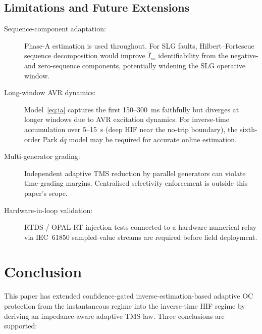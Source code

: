 \documentclass[10pt,journal,twoside]{IEEEtran}
\newcommand{\Iss}{\hat{I}_{ss}}
\begin{document}
\subsection{Limitations and Future Extensions}

\begin{description}
\item[Sequence-component adaptation:]
     Phase-A estimation is used throughout.  For SLG faults,
     Hilbert--Fortescue sequence decomposition would improve $\Iss$
     identifiability from the negative- and zero-sequence components,
     potentially widening the SLG operative window.

\item[Long-window AVR dynamics:]
     Model~\eqref{eq:ia} captures the first 150--300~ms faithfully but
     diverges at longer windows due to AVR excitation dynamics.  For
     inverse-time accumulation over 5--15~s (deep HIF near the no-trip
     boundary), the sixth-order Park $dq$ model may be required for
     accurate online estimation.

\item[Multi-generator grading:]
     Independent adaptive TMS reduction by parallel generators can violate
     time-grading margins.  Centralised selectivity enforcement is outside
     this paper's scope.

\item[Hardware-in-loop validation:]
     RTDS / OPAL-RT injection tests connected to a hardware numerical relay
     via IEC~61850 sampled-value streams are required before field deployment.
\end{description}

\section{Conclusion}
\label{sec:conclusion}

This paper has extended confidence-gated inverse-estimation-based adaptive
OC protection from the instantaneous regime into the inverse-time HIF regime
by deriving an impedance-aware adaptive TMS law.  Three conclusions are
supported:
\end{document}
